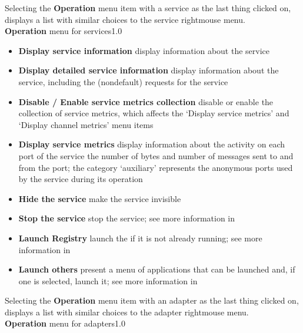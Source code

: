 \condPage{}
Selecting the \textbf{Operation} menu item with a service as the last thing clicked on,
displays a list with similar choices to the service right\longDash{}mouse menu.\\
%
{\textbf{Operation} menu for services}{1.0}
\begin{itemize}
\item\textbf{Display service information} display information about the service
\item\exSp\textbf{Display detailed service information} display information about the
service, including the (non\longDash{}default) requests for the service
\item\exSp\textbf{Disable / Enable service metrics collection} disable or enable the
collection of service metrics, which affects the `Display service metrics' and `Display
channel metrics' menu items
\item\exSp\textbf{Display service metrics} display information about the activity on each
port of the service \longDash{} the number of bytes and number of messages sent to and
from the port; the category `auxiliary' represents the anonymous ports used by the service
during its operation
\item\exSp\textbf{Hide the service} make the service invisible
\item\exSp\textbf{Stop the service} stop the service; see more information in
\item\exSp\textbf{Launch Registry} launch the \emph{\RS} if it is not already running; see
more information in\\
\item\exSp\textbf{Launch others \textellipsis} present a menu of applications that can be
launched and, if one is selected, launch it; see more information in
\end{itemize}
\condPage{}
Selecting the \textbf{Operation} menu item with an adapter as the last thing clicked on,
displays a list with similar choices to the adapter right\longDash{}mouse menu.\\
%
{\textbf{Operation} menu for adapters}{1.0}
